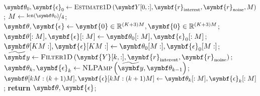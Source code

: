\begin{algorithm}
    \caption{
        Routine for estimating a sequence of \ac{1D} \acp{FID} which exhibit
        variation in amplitudes across increments. \textsc{NLPAmp} denotes a
        routine which is akin to \textsc{NLP} (Algorithm \ref{alg:nlp}), except
        only amplitudes are allowed to be altered, whilst phases, frequencies
        and damping factors are fixed.
    }
    \label{alg:estimate-seq}
    \begin{algorithmic}[1]
        \State $\bth_{0}, \symbf{\epsilon}_{0} \gets \textsc{Estimate$1$D}\left(
            \bY[0, :],
            \symbf{r}_{\text{interest}},
            \symbf{r}_{\text{noise}},
            M
            \right)
        $;
        \State $M \gets \nicefrac{\text{len}\left(\bth_0\right)}{4}$;
        \State $\bth, \symbf{\epsilon} \gets  \symbf{0} \in \mathbb{R}^{(K + 3)M}, \symbf{0} \in \mathbb{R}^{(K + 3)M}$;
        \State $\bth[:M], \symbf{\epsilon}[:M] \gets \bth_0[:M], \symbf{\epsilon}_0[:M]$;
        \State $\bth[KM:], \symbf{\epsilon}[KM:] \gets \bth_0[M:], \symbf{\epsilon}_0[M:]$;
            \State $\widetilde{\by} \gets \textsc{Filter$1$D}\left(
                \symbf{Y}[k,:],
                \symbf{r}_{\text{interest}},
                \symbf{r}_{\text{noise}}
                \right);
                $
            \State $\bth_{k}, \symbf{\epsilon}_k \gets \textsc{NLPAmp}\left(\widetilde{\by}, \bth_{k-1}\right)$;
            \State $\bth[kM : (k+1)M], \symbf{\epsilon}[kM : (k+1)M] \gets \bth_k[:M], \symbf{\epsilon}_k[:M]$;
        \EndFor
        \State \textbf{return} $\bth, \symbf{\epsilon}$;
        \EndProcedure
    \end{algorithmic}
\end{algorithm}

